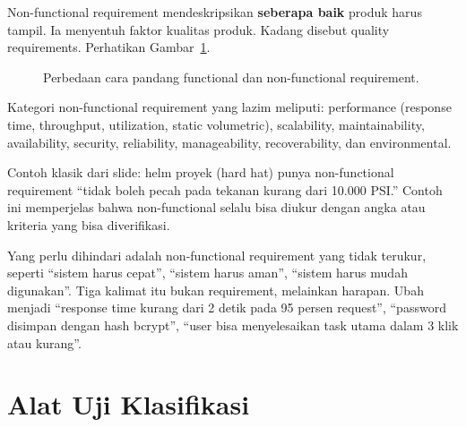 \documentclass[11pt,a4paper]{article}
\begin{document}
Non-functional requirement mendeskripsikan \textbf{seberapa baik} produk harus tampil. Ia menyentuh faktor kualitas produk. Kadang disebut quality requirements. Perhatikan Gambar~\ref{fig:fn-vs-nfr}.

\begin{figure}[H]
	\centering
	\caption{Perbedaan cara pandang functional dan non-functional requirement.}
	\label{fig:fn-vs-nfr}
\end{figure}

Kategori non-functional requirement yang lazim meliputi: performance (response time, throughput, utilization, static volumetric), scalability, maintainability, availability, security, reliability, manageability, recoverability, dan environmental.

Contoh klasik dari slide: helm proyek (hard hat) punya non-functional requirement ``tidak boleh pecah pada tekanan kurang dari 10.000 PSI.'' Contoh ini memperjelas bahwa non-functional selalu bisa diukur dengan angka atau kriteria yang bisa diverifikasi.

Yang perlu dihindari adalah non-functional requirement yang tidak terukur, seperti ``sistem harus cepat'', ``sistem harus aman'', ``sistem harus mudah digunakan''. Tiga kalimat itu bukan requirement, melainkan harapan. Ubah menjadi ``response time kurang dari 2 detik pada 95 persen request'', ``password disimpan dengan hash bcrypt'', ``user bisa menyelesaikan task utama dalam 3 klik atau kurang''.

\section{Alat Uji Klasifikasi}
\end{document}
